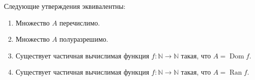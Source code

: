 \documentclass{article}
\begin{document}
    \begin{theorem}
        Следующие утверждения эквивалентны:
        \begin{enumerate}
            \item Множество \(A\) перечислимо.
            \item Множество \(A\) полуразрешимо.
            \item Существует частичная вычислимая функция \(f: \mathbb{N} \to \mathbb{N}\) такая, что
                \(A = \operatorname{Dom} f\).
            \item Существует частичная вычислимая функция \(f: \mathbb{N} \to \mathbb{N}\) такая, что
                \(A = \operatorname{Ran} f\).
        \end{enumerate}
    \end{theorem}
\end{document}
